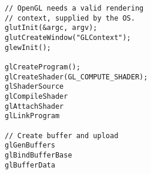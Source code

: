 \lstset{language=C++}
\begin{lstlisting}
// OpenGL needs a valid rendering
// context, supplied by the OS.
glutInit(&argc, argv);
glutCreateWindow("GLContext");
glewInit();

glCreateProgram();
glCreateShader(GL_COMPUTE_SHADER);
glShaderSource
glCompileShader
glAttachShader
glLinkProgram

// Create buffer and upload
glGenBuffers
glBindBufferBase
glBufferData
\end{lstlisting}
